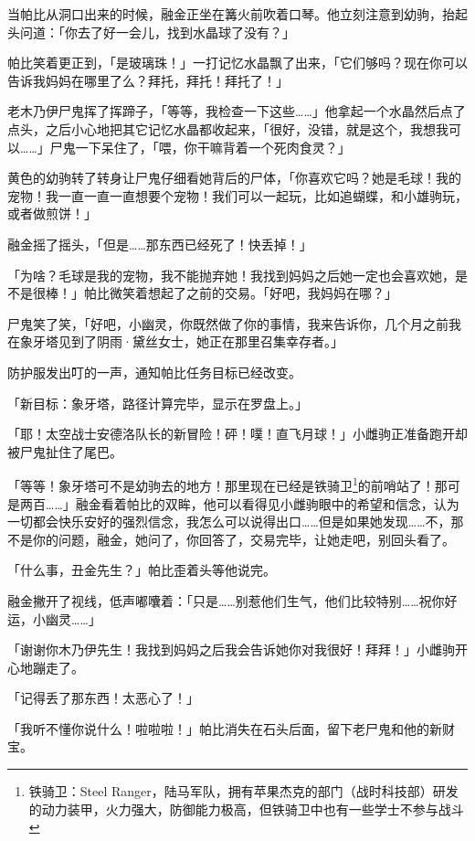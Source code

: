 
当帕比从洞口出来的时候，融金正坐在篝火前吹着口琴。他立刻注意到幼驹，抬起头问道：「你去了好一会儿，找到水晶球了没有？」

帕比笑着更正到，「是玻璃珠！」一打记忆水晶飘了出来，「它们够吗？现在你可以告诉我妈妈在哪里了么？拜托，拜托！拜托了！」

老木乃伊尸鬼挥了挥蹄子，「等等，我检查一下这些……」他拿起一个水晶然后点了点头，之后小心地把其它记忆水晶都收起来，「很好，没错，就是这个，我想我可以……」尸鬼一下呆住了，「喂，你干嘛背着一个死肉食灵？」

黄色的幼驹转了转身让尸鬼仔细看她背后的尸体，「你喜欢它吗？她是毛球！我的宠物！我一直一直一直想要个宠物！我们可以一起玩，比如追蝴蝶，和小雄驹玩，或者做煎饼！」

融金摇了摇头，「但是……那东西已经死了！快丢掉！」

「为啥？毛球是我的宠物，我不能抛弃她！我找到妈妈之后她一定也会喜欢她，是不是很棒！」帕比微笑着想起了之前的交易。「好吧，我妈妈在哪？」

尸鬼笑了笑，「好吧，小幽灵，你既然做了你的事情，我来告诉你，几个月之前我在象牙塔见到了阴雨·黛丝女士，她正在那里召集幸存者。」

防护服发出叮的一声，通知帕比任务目标已经改变。

「{\mt 新目标：象牙塔，路径计算完毕，显示在罗盘上。}」

「耶！太空战士安德洛队长的新冒险！砰！噗！直飞月球！」小雌驹正准备跑开却被尸鬼扯住了尾巴。

「等等！象牙塔可不是幼驹去的地方！那里现在已经是铁骑卫\footnote{铁骑卫：Steel Ranger，陆马军队，拥有苹果杰克的部门（战时科技部）研发的动力装甲，火力强大，防御能力极高，但铁骑卫中也有一些学士不参与战斗}的前哨站了！那可是两百……」融金看着帕比的双眸，他可以看得见小雌驹眼中的希望和信念，认为一切都会快乐安好的强烈信念，我怎么可以说得出口……但是如果她发现……不，那不是你的问题，融金，她问了，你回答了，交易完毕，让她走吧，别回头看了。

「什么事，丑金先生？」帕比歪着头等他说完。

融金撇开了视线，低声嘟囔着：「只是……别惹他们生气，他们比较特别……祝你好运，小幽灵……」

「谢谢你木乃伊先生！我找到妈妈之后我会告诉她你对我很好！拜拜！」小雌驹开心地蹦走了。

「记得丢了那东西！太恶心了！」

「我听不懂你说什么！啦啦啦！」帕比消失在石头后面，留下老尸鬼和他的新财宝。

